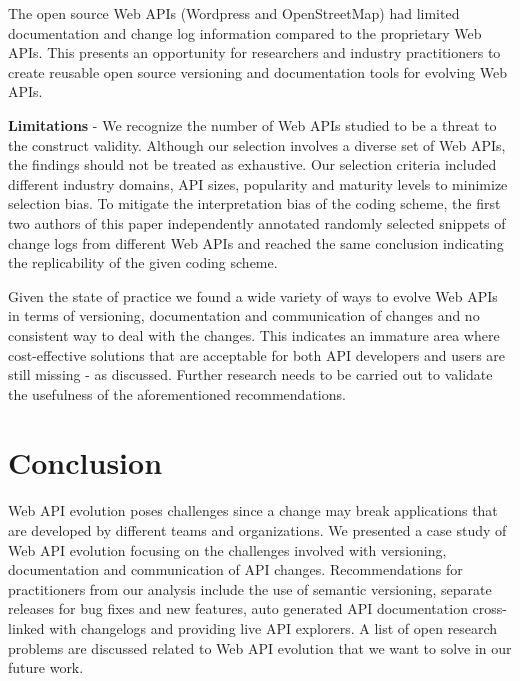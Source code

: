 \documentclass[conference]{IEEEtran}
\begin{document}
The open source Web APIs (Wordpress and OpenStreetMap) had limited documentation and change log information compared to the proprietary Web APIs. This presents an opportunity for researchers and industry practitioners to create reusable open source versioning and documentation tools for evolving Web APIs.

\textbf{Limitations} - We recognize the number of Web APIs studied to be a threat to the construct validity. Although our selection involves a diverse set of Web APIs, the findings should not be treated as exhaustive. Our selection criteria included different industry domains, API sizes, popularity and maturity levels to minimize selection bias. To mitigate the interpretation bias of the coding scheme, the first two authors of this paper independently annotated randomly selected snippets of change logs from different Web APIs and reached the same conclusion indicating the replicability of the given coding scheme.

Given the state of practice we found a wide variety of ways to evolve Web APIs in terms of versioning, documentation and communication of changes and no consistent way to deal with the changes. This indicates an immature area where cost-effective solutions that are acceptable for both API developers and users are still missing - as discussed. Further research needs to be carried out to validate the usefulness of the aforementioned recommendations.

\section{Conclusion}
Web API evolution poses challenges since a change may break applications that are developed by different teams and organizations. We presented a case study of Web API evolution focusing on the challenges involved with versioning, documentation and communication of API changes. Recommendations for practitioners from our analysis include the use of semantic versioning, separate releases for bug fixes and new features, auto generated API documentation cross-linked with changelogs and providing live API explorers. A list of open research problems are discussed related to Web API evolution that we want to solve in our future work.



\end{document}
